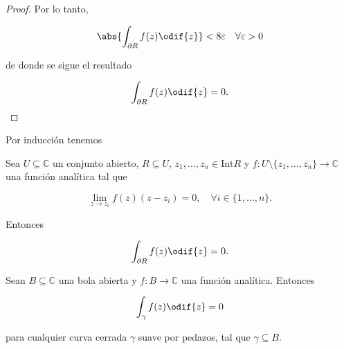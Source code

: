 \documentclass[../main.tex]{subfiles}
\begin{document}
\begin{proof}
    Por lo tanto,

    \begin{equation}
        \abs{\int_{\partial R}^{}f(z)\odif{z}} < 8\varepsilon\quad \forall
        \varepsilon > 0
    \end{equation}

    de donde se sigue el resultado

    \begin{equation*}
        \int_{\partial R}^{}f(z)\odif{z} = 0.
    \end{equation*}
\end{proof}

Por inducción tenemos

\begin{corollary}[Goursat 2.1]
    Sea \(U \subseteq \mathbb{C}\) un conjunto abierto, \(R \subseteq U\), \(z_{1},
    \dots, z_{n}\in \mathrm{Int}R\) y \( f \colon U\setminus \{z_{1}, \dots, z_{n}\} \to
    \mathbb{C}\) una función analítica tal que

    \begin{equation*}
        \lim_{z \to z_{i}}f(z)(z - z_{i}) = 0,\quad \forall i\in \{1, \dots, n\}.
    \end{equation*}

    Entonces

    \begin{equation*}
        \int_{\partial R}^{}f(z)\odif{z} = 0.
    \end{equation*}
\end{corollary}

\begin{theorem}\label{theo:cauchy-local}
    Sean \(B \subseteq \mathbb{C}\) una bola abierta y \(f \colon B \to \mathbb{C}\) una
    función analítica. Entonces

    \begin{equation*}
        \int_{\gamma}^{}f(z)\odif{z} = 0
    \end{equation*}

    para cualquier curva cerrada \(\gamma\) suave por pedazos, tal que
    \(\gamma \subseteq
    B\).
\end{theorem}
\end{document}
